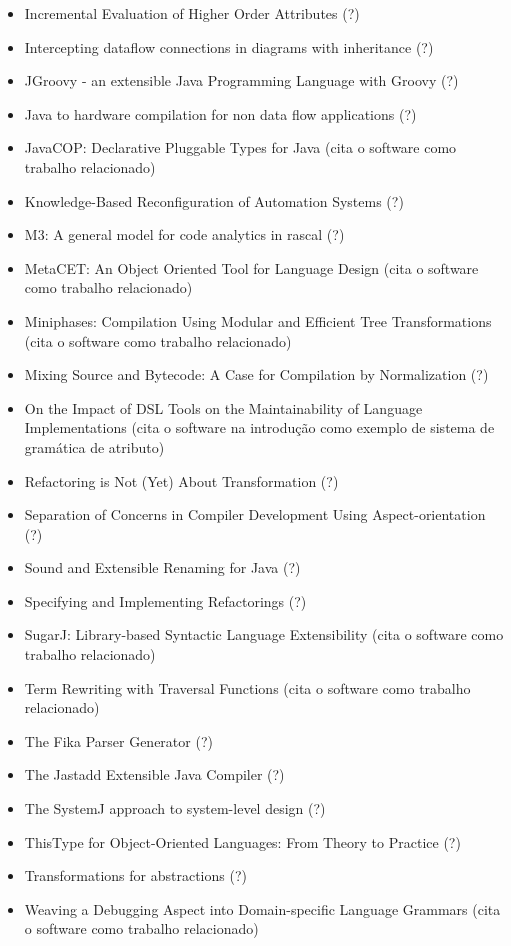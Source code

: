 \begin{itemize}
\item Incremental Evaluation of Higher Order Attributes (?)
\item Intercepting dataflow connections in diagrams with inheritance (?)
\item JGroovy - an extensible Java Programming Language with Groovy (?)
\item Java to hardware compilation for non data flow applications (?)
\item JavaCOP: Declarative Pluggable Types for Java (cita o software como trabalho relacionado)
\item Knowledge-Based Reconfiguration of Automation Systems (?)
\item M3: A general model for code analytics in rascal (?)
\item MetaCET: An Object Oriented Tool for Language Design (cita o software como trabalho relacionado)
\item Miniphases: Compilation Using Modular and Efficient Tree Transformations (cita o software como trabalho relacionado)
\item Mixing Source and Bytecode: A Case for Compilation by Normalization (?)
\item On the Impact of DSL Tools on the Maintainability of Language Implementations (cita o software na introdução como exemplo de sistema de gramática de atributo)
\item Refactoring is Not (Yet) About Transformation (?)
\item Separation of Concerns in Compiler Development Using Aspect-orientation (?)
\item Sound and Extensible Renaming for Java (?)
\item Specifying and Implementing Refactorings (?)
\item SugarJ: Library-based Syntactic Language Extensibility (cita o software como trabalho relacionado)
\item Term Rewriting with Traversal Functions (cita o software como trabalho relacionado)
\item The Fika Parser Generator (?)
\item The Jastadd Extensible Java Compiler (?)
\item The SystemJ approach to system-level design (?)
\item ThisType for Object-Oriented Languages: From Theory to Practice (?)
\item Transformations for abstractions (?)
\item Weaving a Debugging Aspect into Domain-specific Language Grammars (cita o software como trabalho relacionado)
\end{itemize}

